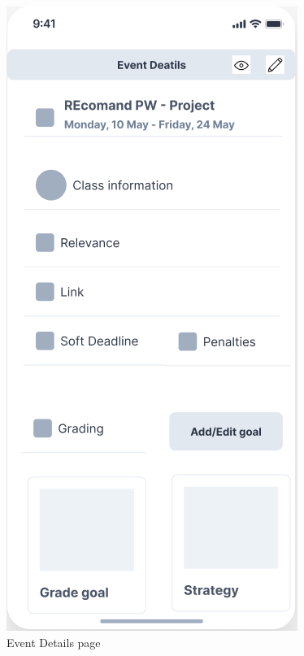 \begin{figure}[!ht]
\begin{minipage}[b]{0.43\textwidth}
        \includegraphics[width=\textwidth]{figures/wf/image51.png}
        \caption{Event Details page}

\end{minipage}
\end{figure}
